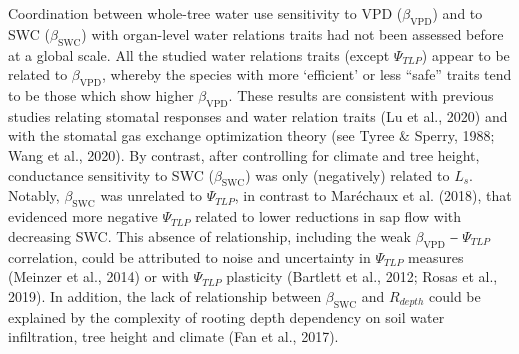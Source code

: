 \documentclass[11pt,twoside]{reedthesis}
\begin{document}
Coordination between whole-tree water use sensitivity to VPD
(\(\beta_{\text{VPD}}\)) and to SWC (\(\beta_{\text{SWC}}\)) with
organ-level water relations traits had not been assessed before at a
global scale. All the studied water relations traits (except
\(\Psi_{TLP}\)) appear to be related to \(\beta_{\text{VPD}}\), whereby
the species with more `efficient' or less ``safe'' traits tend to be
those which show higher \(\beta_{\text{VPD}}\). These results are
consistent with previous studies relating stomatal responses and water
relation traits (Lu et al., 2020) and with the stomatal gas exchange
optimization theory (see Tyree \& Sperry, 1988; Wang et al., 2020). By
contrast, after controlling for climate and tree height, conductance
sensitivity to SWC (\(\beta_{\text{SWC}}\)) was only (negatively)
related to \(L_s\). Notably, \(\beta_{\text{SWC}}\) was unrelated to
\(\Psi_{TLP}\), in contrast to Maréchaux et al. (2018), that evidenced
more negative \(\Psi_{TLP}\) related to lower reductions in sap flow
with decreasing SWC. This absence of relationship, including the weak
\(\beta_{\text{VPD}}\) ‒ \(\Psi_{TLP}\) correlation, could be attributed
to noise and uncertainty in \(\Psi_{TLP}\) measures (Meinzer et al.,
2014) or with \(\Psi_{TLP}\) plasticity (Bartlett et al., 2012; Rosas et
al., 2019). In addition, the lack of relationship between
\(\beta_{\text{SWC}}\) and \(R_{depth}\) could be explained by the
complexity of rooting depth dependency on soil water infiltration, tree
height and climate (Fan et al., 2017).\par
\end{document}
